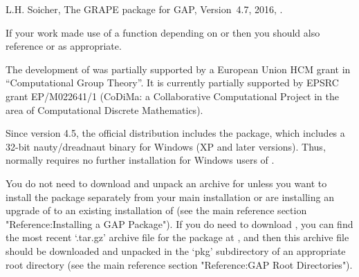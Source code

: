 L.H. Soicher, The {GRAPE} package for {GAP}, Version~4.7, 2016,
.

If your work made use of a function depending on {\nauty} or {\bliss}
then you should also reference {\nauty} \cite{Nau90,MP14} or {\bliss}
\cite{JK07} as appropriate.

The development of {\GRAPE} was partially supported by a European
Union HCM grant in ``Computational Group Theory''. It is currently
partially supported by EPSRC grant EP/M022641/1 (CoDiMa: a Collaborative
Computational Project in the area of Computational Discrete Mathematics).



Since version 4.5, the official {\GAP} distribution includes the {\GRAPE}
package, which includes a 32-bit nauty/dreadnaut binary for Windows
(XP and later versions).  Thus, {\GRAPE} normally requires no further
installation for Windows users of {\GAP}.

You do not need to download and unpack an archive for {\GRAPE}
unless you want to install the package separately from your main
{\GAP} installation or are installing an upgrade of {\GRAPE} to an
existing installation of {\GAP} (see the main {\GAP} reference section
"Reference:Installing a GAP Package").  If you do need to download
{\GRAPE}, you can find the most recent `.tar.gz' archive file for
the package at , and
then this archive file should be downloaded and unpacked in the `pkg'
subdirectory of an appropriate {\GAP} root directory (see the main {\GAP}
reference section "Reference:GAP Root Directories").

